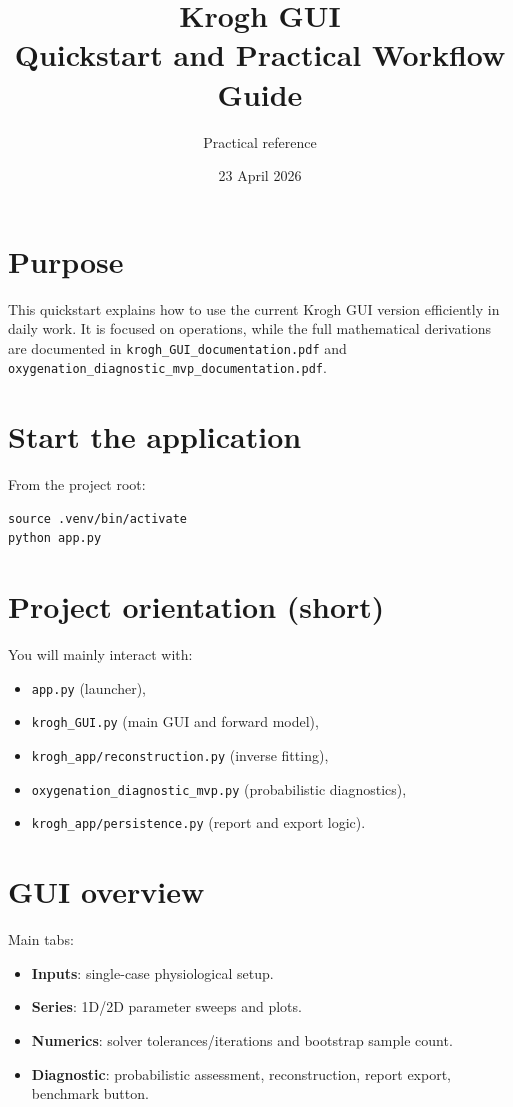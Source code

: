 \documentclass[12pt,a4paper]{article}
\title{Krogh GUI\\Quickstart and Practical Workflow Guide}
\author{Practical reference}
\date{23 April 2026}
\begin{document}
\sloppy
\maketitle
\tableofcontents

\section{Purpose}
This quickstart explains how to use the current Krogh GUI version efficiently in daily work. It is focused on operations, while the full mathematical derivations are documented in \texttt{krogh\_GUI\_documentation.pdf} and \texttt{oxygenation\_diagnostic\_mvp\_documentation.pdf}.

\section{Start the application}
From the project root:
\begin{verbatim}
source .venv/bin/activate
python app.py
\end{verbatim}

\section{Project orientation (short)}
You will mainly interact with:
\begin{itemize}
    \item \texttt{app.py} (launcher),
    \item \texttt{krogh\_GUI.py} (main GUI and forward model),
    \item \texttt{krogh\_app/reconstruction.py} (inverse fitting),
    \item \texttt{oxygenation\_diagnostic\_mvp.py} (probabilistic diagnostics),
    \item \texttt{krogh\_app/persistence.py} (report and export logic).
\end{itemize}

\section{GUI overview}
Main tabs:
\begin{itemize}
    \item \textbf{Inputs}: single-case physiological setup.
    \item \textbf{Series}: 1D/2D parameter sweeps and plots.
    \item \textbf{Numerics}: solver tolerances/iterations and bootstrap sample count.
    \item \textbf{Diagnostic}: probabilistic assessment, reconstruction, report export, benchmark button.
\end{itemize}
\end{document}
